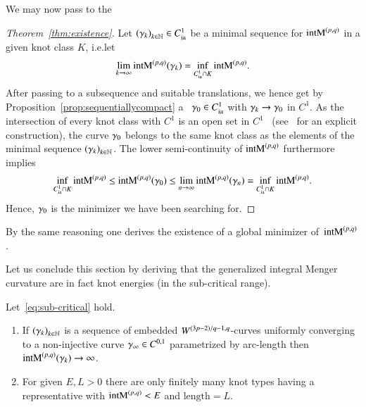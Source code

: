 We may now pass to the

\begin{proof}[Theorem~\ref{thm:existence}]
 Let $\seqn[k]{\g}\in \Cia$ be a minimal sequence for $\E$ in a given knot class $K$,
 i.e.\@ let
 \begin{equation*}
  \lim_{k\rightarrow \infty} \E(\g_{k}) = \inf_{\Cia\cap K} \E.
 \end{equation*}
 After passing to a subsequence and suitable translations, we hence get by Proposition~\ref{prop:sequentiallycompact} 
 a ~$\g_0\in \Cia$ with $\g_k\to\g_0$ in $C^1$.
 As the intersection of every knot class with $C^1$
 is an open set in $C^1$~\cite[Cor.~1.5]{blatt:isot}
 (see~\cite{reiter:isot} for an explicit construction),
 the curve $\g_0$ belongs to the same knot class
 as the elements of the minimal sequence $\seqn[k]{\g}$. 
 The lower semi-continuity of $\E$ furthermore implies
 \begin{equation*}
  \inf_{\Cia\cap K} \E\leq \E(\g_0)
  \leq  \lim_{n\rightarrow \infty} \E(\g_n)=\inf_{\Cia\cap K}\E.
 \end{equation*}
 Hence, $\g_0$ is the minimizer we have been searching for.
\end{proof}

By the same reasoning one derives the existence of a global minimizer of~$\E$.

Let us conclude this section by deriving that the generalized integral Menger curvature
are in fact knot energies (in the sub-critical range).

\begin{proposition}\label{prop:strong-knot-energy}%
Let~\eqref{eq:sub-critical} hold.\\[-2em]
 \begin{enumerate}
  \item If $\seqn[k]{\g}$ %
  is a sequence of embedded $\W$-curves uniformly converging to a non-injective curve $\g_\infty\in C^{0,1}$ parametrized by arc-length then $\E(\g_k)\to\infty$.
  \item For given $E,L>0$ there are only finitely many knot types having a representative with $\E<E$ and $\text{length}=L$.
 \end{enumerate}
\end{proposition}

